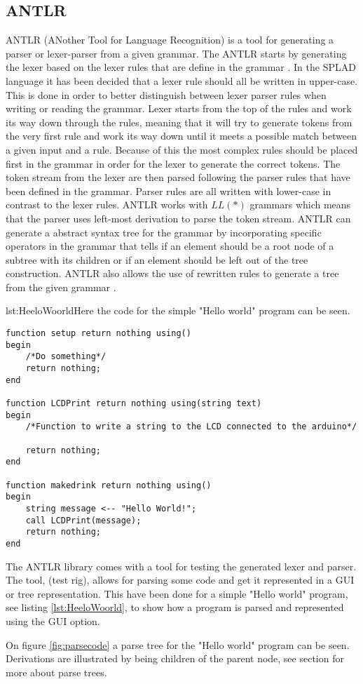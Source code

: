 \subsection{ANTLR}
ANTLR (ANother Tool for Language Recognition) is a tool for generating a parser or lexer-parser from a given grammar. The ANTLR starts by generating the lexer based on the lexer rules that are define in the grammar \citep{ANTLRLexer}.
In the SPLAD language it has been decided that a lexer rule should all be written in upper-case. This is done in order to better distinguish between lexer parser rules when writing or reading the grammar. Lexer starts from the top of the rules and work its way down through the rules, meaning that it will try to generate tokens from the very first rule and work its way down until it meets a possible match between a given input and a rule. Because of this the most complex rules should be placed first in the grammar in order for the lexer to generate the correct tokens. 
The token stream from the lexer are then parsed following the parser rules that have been defined in the grammar. Parser rules are all written with lower-case in contrast to the lexer rules. ANTLR works with $LL(*)$ grammars which means that the parser uses left-most derivation to parse the token stream. ANTLR can generate a abstract syntax tree for the grammar by incorporating specific operators in the grammar that tells if an element should be a root node of a subtree with its children or if an element should be left out of the tree construction. ANTLR also allows the use of rewritten rules to generate a tree from the given grammar \citep{ANTLRTreeCon}.

\begin{code}{lst:HeeloWoorld}{Here the code for the simple "Hello world" program can be seen.}
\begin{lstlisting}
function setup return nothing using()
begin
	/*Do something*/
	return nothing;
end

function LCDPrint return nothing using(string text)
begin
	/*Function to write a string to the LCD connected to the arduino*/
		
	return nothing;
end

function makedrink return nothing using()
begin
	string message <-- "Hello World!";
	call LCDPrint(message);
	return nothing;
end
\end{lstlisting}
\end{code}

The ANTLR library comes with a tool for testing the generated lexer and parser. The tool, (test rig), allows for parsing some code and get it represented
in a GUI or tree representation. This have been done for a simple "Hello world" program, see listing \ref{lst:HeeloWoorld}, to show how a program is parsed and represented using the GUI option.


On figure \ref{fig:parsecode} a parse tree for the "Hello world" program can be seen. Derivations are illustrated by being children of the parent node, see section  for more about parse trees.
